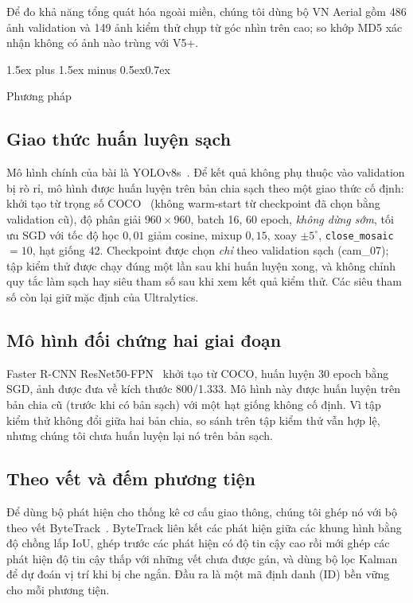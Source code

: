 \documentclass[10pt,journal,letterpaper]{IEEEtran}
\makeatletter
\renewcommand\section{\@startsection{section}{1}{\z@}%
  {1.5ex plus 1.5ex minus 0.5ex}{0.7ex}{\normalfont\scshape\raggedright}}
\makeatother
\begin{document}
Để đo khả năng tổng quát hóa ngoài miền, chúng tôi dùng bộ VN Aerial gồm 486 ảnh validation và 149 ảnh kiểm thử chụp từ góc nhìn trên cao; so khớp MD5 xác nhận không có ảnh nào trùng với V5+.

\section{Phương pháp}
\subsection{Giao thức huấn luyện sạch}
Mô hình chính của bài là YOLOv8s~\cite{yolov8docs}. Để kết quả không phụ thuộc vào validation bị rò rỉ, mô hình được huấn luyện trên bản chia sạch theo một giao thức cố định: khởi tạo từ trọng số COCO~\cite{coco} (không warm-start từ checkpoint đã chọn bằng validation cũ), độ phân giải $960\times960$, batch 16, 60 epoch, \emph{không dừng sớm}, tối ưu SGD với tốc độ học $0{,}01$ giảm cosine, mixup $0{,}15$, xoay $\pm5^{\circ}$, \texttt{close\_mosaic}$=10$, hạt giống 42. Checkpoint được chọn \emph{chỉ} theo validation sạch (cam\_07); tập kiểm thử được chạy đúng một lần sau khi huấn luyện xong, và không chỉnh quy tắc làm sạch hay siêu tham số sau khi xem kết quả kiểm thử. Các siêu tham số còn lại giữ mặc định của Ultralytics.

\subsection{Mô hình đối chứng hai giai đoạn}
Faster R-CNN ResNet50-FPN~\cite{tvfrcnn} khởi tạo từ COCO, huấn luyện 30 epoch bằng SGD, ảnh được đưa về kích thước 800/1.333. Mô hình này được huấn luyện trên bản chia cũ (trước khi có bản sạch) với một hạt giống không cố định. Vì tập kiểm thử không đổi giữa hai bản chia, so sánh trên tập kiểm thử vẫn hợp lệ, nhưng chúng tôi chưa huấn luyện lại nó trên bản sạch.

\subsection{Theo vết và đếm phương tiện}
Để dùng bộ phát hiện cho thống kê cơ cấu giao thông, chúng tôi ghép nó với bộ theo vết ByteTrack~\cite{bytetrack}. ByteTrack liên kết các phát hiện giữa các khung hình bằng độ chồng lấp IoU, ghép trước các phát hiện có độ tin cậy cao rồi mới ghép các phát hiện độ tin cậy thấp với những vết chưa được gán, và dùng bộ lọc Kalman để dự đoán vị trí khi bị che ngắn. Đầu ra là một mã định danh (ID) bền vững cho mỗi phương tiện.
\end{document}
